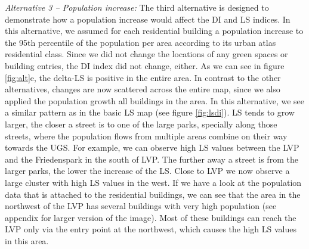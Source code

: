 \documentclass[10pt]{article}
\begin{document}
\textit{Alternative 3 – Population increase:} The third alternative is designed to demonstrate how a population increase would affect the DI and LS indices.
In this alternative, we assumed for each residential building a population increase to the 95th percentile of the population per area according to its urban atlas residential class.
Since we did not change the locations of any green spaces or building entries, the DI index did not change, either.
As we can see in figure \ref{fig:alt}e, the delta-LS is positive in the entire area.
In contrast to the other alternatives, changes are now scattered across the entire map, since we also applied the population growth all buildings in the area.
In this alternative, we see a similar pattern as in the basic LS map (see figure \ref{fig:lsdi}). 
LS tends to grow larger, the closer a street is to one of the large parks, specially along those streets, where the population flows from multiple areas combine on their way towards the UGS.
For example, we can observe high LS values between the LVP and the Friedenspark in the south of LVP.
The further away a street is from the larger parks, the lower the increase of the LS.
Close to LVP we now observe a large cluster with high LS values in the west.
If we have a look at the population data that is attached to the residential buildings, we can see that the area in the northwest of the LVP has several buildings with very high population (see appendix for larger version of the image).
Most of these buildings can reach the LVP only via the entry point at the northwest, which causes the high LS values in this area. 
\end{document}
